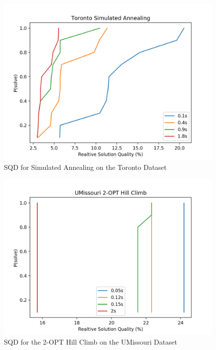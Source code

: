 \documentclass[format=sigconf]{acmart}
\begin{document}
\begin{figure}[htbp]
    \centerline{\includegraphics[scale=.5]{graphs/Toronto_LS2_SQD.png}}
    \caption{SQD for Simulated Annealing on the Toronto Dataset}
    \label{fig:6}
\end{figure}

\begin{figure}[htbp]
    \centerline{\includegraphics[scale=.5]{graphs/UMissouri_LS1_SQD.png}}
    \caption{SQD for the 2-OPT Hill Climb on the UMissouri Dataset}
    \label{fig:7}
\end{figure}
\end{document}

